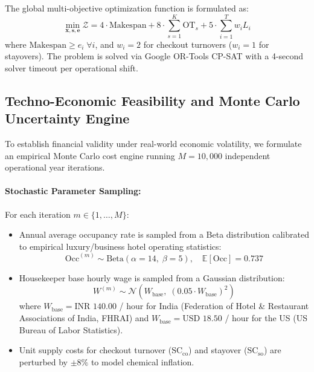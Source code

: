 \documentclass[11pt,a4paper]{article}
\newcommand{\INR}{\text{INR }}
\newcommand{\USD}{\text{USD }}
\begin{document}
The global multi-objective optimization function is formulated as:
\begin{equation}
\min_{\mathbf{x}, \mathbf{s}, \mathbf{e}} \mathcal{Z} = 4 \cdot \text{Makespan} + 8 \cdot \sum_{s=1}^{K} \text{OT}_s + 5 \cdot \sum_{i=1}^{T} w_i L_i
\end{equation}
where $\text{Makespan} \ge e_i \; \forall i$, and $w_i = 2$ for checkout turnovers ($w_i = 1$ for stayovers). The problem is solved via Google OR-Tools CP-SAT with a 4-second solver timeout per operational shift.

\subsection{Techno-Economic Feasibility and Monte Carlo Uncertainty Engine}
To establish financial validity under real-world economic volatility, we formulate an empirical Monte Carlo cost engine running $M = 10,000$ independent operational year iterations.

\paragraph{Stochastic Parameter Sampling:} For each iteration $m \in \{1, \dots, M\}$:
\begin{itemize}
    \item Annual average occupancy rate is sampled from a Beta distribution calibrated to empirical luxury/business hotel operating statistics:
    \begin{equation}
    \text{Occ}^{(m)} \sim \text{Beta}(\alpha = 14, \; \beta = 5), \quad \mathbb{E}[\text{Occ}] = 0.737
    \end{equation}
    \item Housekeeper base hourly wage is sampled from a Gaussian distribution:
    \begin{equation}
    W^{(m)} \sim \mathcal{N}\left(W_{\text{base}}, \; (0.05 \cdot W_{\text{base}})^2\right)
    \end{equation}
    where $W_{\text{base}} = \INR 140.00$ / hour for India (Federation of Hotel \& Restaurant Associations of India, FHRAI) and $W_{\text{base}} = \USD 18.50$ / hour for the US (US Bureau of Labor Statistics).
    \item Unit supply costs for checkout turnover ($\text{SC}_{\text{co}}$) and stayover ($\text{SC}_{\text{so}}$) are perturbed by $\pm 8\%$ to model chemical inflation.
\end{itemize}
\end{document}
